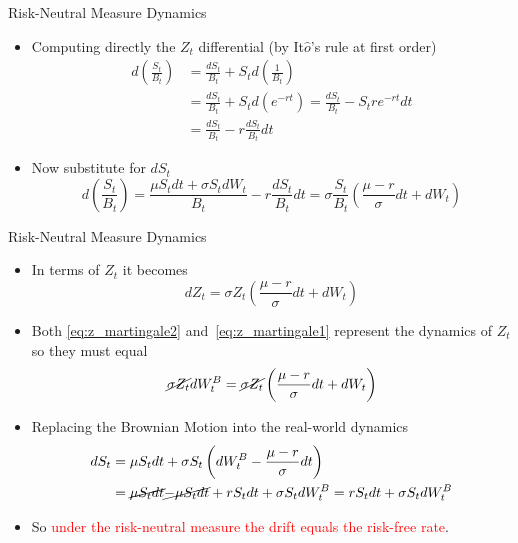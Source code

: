 \documentclass{beamer}
\begin{document}
\begin{frame}{Risk-Neutral Measure Dynamics}
  \begin{itemize}
  \item Computing directly the $Z_t$ differential (by It$\hat{o}$'s rule at first order)
    \begin{equation*}
      \begin{aligned}
	d\left(\frac{S_t}{B_t}\right) &= \frac{dS_t}{B_t} + S_t d\left(\frac{1}{B_t}\right) \\ 
	&=\frac{dS_t}{B_t} + S_t d\left(e^{-rt}\right) = \frac{dS_t}{B_t} - S_t re^{-rt}dt \\
	&= \frac{dS_t}{B_t} - r\frac{dS_t}{B_t}dt 
      \end{aligned}
    \end{equation*}
  \item Now substitute for $dS_t$
    \begin{equation*}
      d\left(\frac{S_t}{B_t}\right)= \frac{ \mu S_t dt + \sigma S_t dW_t}{B_t} - r\frac{dS_t}{B_t}dt = \sigma\frac{S_t}{B_t}\left(\frac{\mu - r}{\sigma}dt + dW_t \right)
    \end{equation*}	
  \end{itemize}
\end{frame}

\begin{frame}{Risk-Neutral Measure Dynamics}
  \begin{itemize}
  \item In terms of $Z_t$ it becomes
    \begin{equation}
      dZ_t = \sigma Z_t\left(\frac{\mu - r}{\sigma}dt + dW_t \right)
      \label{eq:z_martingale2}
    \end{equation}
  \item Both \cref{eq:z_martingale2} and~\cref{eq:z_martingale1} represent the dynamics of $Z_t$ so they must equal
    \begin{equation*}
      \cancel{\sigma Z_t}dW_t^B = \cancel{\sigma Z_t}\left(\frac{\mu - r}{\sigma}dt + dW_t\right)
    \end{equation*}
  \item Replacing the Brownian Motion into the real-world dynamics
    \begin{equation*}
      \begin{aligned}
	dS_t &= \mu S_t dt + \sigma S_t \left(dW_t^B - \frac{\mu - r}{\sigma}dt\right) \\
	& = \cancel{\mu S_t dt} \cancel{-\mu S_t dt} + rS_t dt + \sigma S_t dW_t^B  = rS_t dt + \sigma S_t dW_t^B
      \end{aligned}
    \end{equation*}
  \item So \textcolor{red}{under the risk-neutral measure the drift equals the risk-free rate}.
  \end{itemize}
\end{frame}
\end{document}
